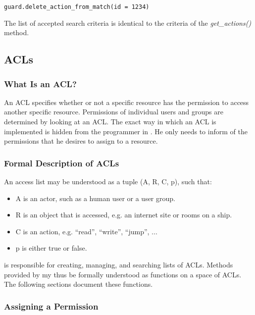 \begin{lstlisting}
guard.delete_action_from_match(id = 1234)
\end{lstlisting}

The list of accepted search criteria is identical to the criteria of the 
{\it get\_actions()} method.


\subsection{ACLs}
\subsubsection{What Is an ACL?}

An ACL specifies whether or not a specific resource has the permission to 
access another specific resource. Permissions of individual users and groups 
are determined by looking at an ACL. The exact way in which an ACL is 
implemented is hidden from the programmer in \product. He only needs to 
inform \product of the permissions that he desires to assign to a resource.


\subsubsection{Formal Description of ACLs}

An access list may be understood as a tuple (A, R, C, p), such that:

\begin{itemize}
\item A is an actor, such as a human user or a user group.
\item R is an object that is accessed, e.g. an internet site or rooms on a 
ship.
\item C is an action, e.g. ``read'', ``write'', ``jump'', ...
\item p is either true or false.
\end{itemize}


\product is responsible for creating, managing, and searching lists of ACLs. 
Methods provided by \product my thus be formally understood as functions on 
a space of ACLs. The following sections document these functions.


\subsubsection{Assigning a Permission}


